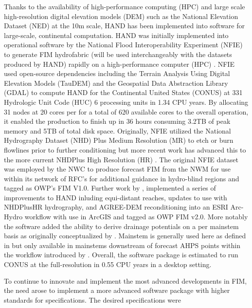 Thanks to the availability of high-performance computing (HPC) and large scale high-resolution digital elevation models (DEM) such as the National Elevation Dataset (NED) at the 10m scale, HAND has been implemented into software for large-scale, continental computation. 
HAND was initially implemented into operational software by the National Flood Interoperability Experiment (NFIE) to generate FIM hydrofabric (will be used interchangeably with the datasets produced by HAND) rapidly on a high-performance computer (HPC) \cite{maidment2017conceptual,liu2016cybergis}. 
NFIE used open-source dependencies including the Terrain Analysis Using Digital Elevation Models (TauDEM) \cite{tarboton2005terrain} and the Geospatial Data Abstraction Library (GDAL) \cite{warmerdam2008geospatial} to compute HAND for the Continental United States (CONUS) at 331 Hydrologic Unit Code (HUC) 6 processing units in 1.34 CPU years.
By allocating 31 nodes at 20 cores per for a total of 620 available cores to the overall operation, it enabled the production to finish up in 36 hours consuming 3.2TB of peak memory and 5TB of total disk space.
Originally, NFIE utilized the National Hydrography Dataset (NHD) Plus Medium Resolution (MR) to etch or burn flowlines prior to further conditioning but more recent work has advanced this to the more current NHDPlus High Resolution (HR) \cite{liu2020height}. 
The original NFIE dataset was employed by the NWC to produce forecast FIM from the NWM for use within its network of RFC's for additional guidance in hydro-blind regions and tagged as OWP's FIM V1.0.
Further work by , implemented a series of improvements to HAND inluding equi-distant reaches, updates to use with NHDPlusHR hydrography, and AGREE-DEM reconditioning \cite{hellweger1997agree} into an ESRI Arc-Hydro workflow with use in ArcGIS and tagged as OWP FIM v2.0. 
More notably the software added the ability to derive drainage potentials on a per mainstem basis as originally conceptualized by \cite{mcgehee2016modified}.
Mainstem is generally used here as defined in  but only available in mainstems downstream of forecast AHPS points within the workflow introduced by .
Overall, the software package is estimated to run CONUS at the full-resolution in 0.55 CPU years in a desktop setting.


To continue to innovate and implement the most advanced developments in FIM, the need arose to implement a more advanced software package with higher standards for specifications. The desired specifications were

